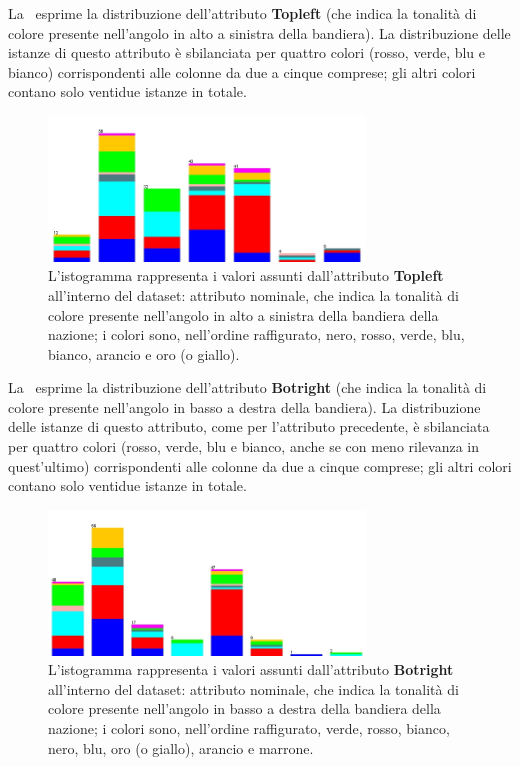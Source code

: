 \documentclass[a4paper,11pt,twoside,notitlepage,final]{scrartcl}
\begin{document}
La~ esprime la distribuzione dell'attributo \textbf{Topleft} (che indica la tonalità di colore presente nell'angolo in alto a sinistra della bandiera).
La distribuzione delle istanze di questo attributo è sbilanciata per quattro colori (rosso, verde, blu e bianco) corrispondenti alle colonne da due a cinque comprese; gli altri colori contano solo ventidue istanze in totale.

\begin{figure}[H]
  \centering
  \includegraphics[width=0.75\textwidth]{fig/religion-topleft.jpg}%
  \caption{%
    L'istogramma rappresenta i valori assunti dall'attributo \textbf{Topleft}
    all'interno del dataset: attributo nominale, che indica la tonalità di colore presente nell'angolo in alto a sinistra della bandiera della nazione;
    i colori sono, nell'ordine raffigurato, nero, rosso, verde, blu, bianco, arancio e oro (o giallo).
    }%
  \label{fig:topleft}
\end{figure}

La~ esprime la distribuzione dell'attributo \textbf{Botright} (che indica la tonalità di colore presente nell'angolo in basso a destra della bandiera).
La distribuzione delle istanze di questo attributo, come per l'attributo precedente, è sbilanciata per quattro colori (rosso, verde, blu e bianco, anche se con meno rilevanza in quest'ultimo) corrispondenti alle colonne da due a cinque comprese; gli altri colori contano solo ventidue istanze in totale.

\begin{figure}[H]
  \centering
  \includegraphics[width=0.75\textwidth]{fig/religion-botright.jpg}%
  \caption{%
    L'istogramma rappresenta i valori assunti dall'attributo \textbf{Botright}
    all'interno del dataset: attributo nominale, che indica la tonalità di colore presente nell'angolo in basso a destra della bandiera della nazione;
    i colori sono, nell'ordine raffigurato, verde, rosso, bianco, nero, blu, oro (o giallo), arancio e marrone.
    }%
  \label{fig:botright}
\end{figure}
\end{document}
